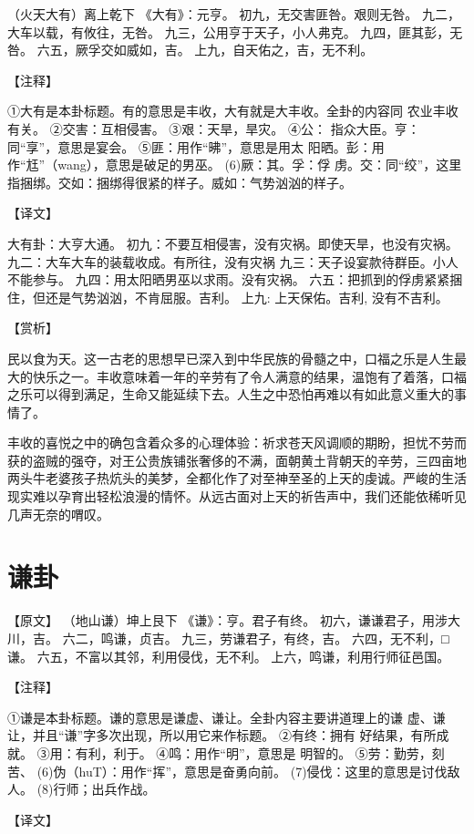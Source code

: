 \documentclass[12pt,UTF8]{ctexbook}
\begin{document}
（火天大有）离上乾下
《大有》：元亨。
初九，无交害匪咎。艰则无咎。
九二，大车以载，有攸往，无咎。
九三，公用亨于天子，小人弗克。
九四，匪其彭，无咎。
六五，厥孚交如威如，吉。
上九，自天佑之，吉，无不利。

【注释】

①大有是本卦标题。有的意思是丰收，大有就是大丰收。全卦的内容同 农业丰收有关。
②交害：互相侵害。
③艰：天旱，旱灾。
④公： 指众大臣。亨：同“享”，意思是宴会。
⑤匪：用作“昲”，意思是用太 阳晒。彭：用作“尪”（wang），意思是破足的男巫。
(6)厥：其。孚：俘 虏。交：同“绞”，这里指捆绑。交如：捆绑得很紧的样子。威如：气势汹汹的样子。

【译文】

大有卦：大亨大通。
初九：不要互相侵害，没有灾祸。即使天旱，也没有灾祸。
九二：大车大车的装载收成。有所往，没有灾祸
九三：天子设宴款待群臣。小人不能参与。
九四：用太阳晒男巫以求雨。没有灾祸。
六五：把抓到的俘虏紧紧捆住，但还是气势汹汹，不肯屈服。吉利。
上九: 上天保佑。吉利, 没有不吉利。

【赏析】

民以食为天。这一古老的思想早已深入到中华民族的骨髓之中，口福之乐是人生最大的快乐之一。丰收意味着一年的辛劳有了令人满意的结果，温饱有了着落，口福之乐可以得到满足，生命又能延续下去。人生之中恐怕再难以有如此意义重大的事情了。

丰收的喜悦之中的确包含着众多的心理体验：祈求苍天风调顺的期盼，担忧不劳而获的盗贼的强夺，对王公贵族铺张奢侈的不满，面朝黄土背朝天的辛劳，三四亩地两头牛老婆孩子热炕头的美梦，全都化作了对至神至圣的上天的虔诚。严峻的生活现实难以孕育出轻松浪漫的情怀。从远古面对上天的祈告声中，我们还能依稀听见几声无奈的喟叹。

\chapter{谦卦}

【原文】
（地山谦）坤上艮下
《谦》：亨。君子有终。
初六，谦谦君子，用涉大川，吉。
六二，鸣谦，贞吉。
九三，劳谦君子，有终，吉。
六四，无不利，□谦。
六五，不富以其邻，利用侵伐，无不利。
上六，鸣谦，利用行师征邑国。

【注释】

①谦是本卦标题。谦的意思是谦虚、谦让。全卦内容主要讲道理上的谦 虚、谦让，并且“谦”字多次出现，所以用它来作标题。
②有终：拥有 好结果，有所成就。
③用：有利，利于。
④鸣：用作“明”，意思是 明智的。
⑤劳：勤劳，刻苦、
(6)伪（huT）：用作“挥”，意思是奋勇向前。
(7)侵伐：这里的意思是讨伐敌人。
(8)行师；出兵作战。

【译文】
\end{document}
